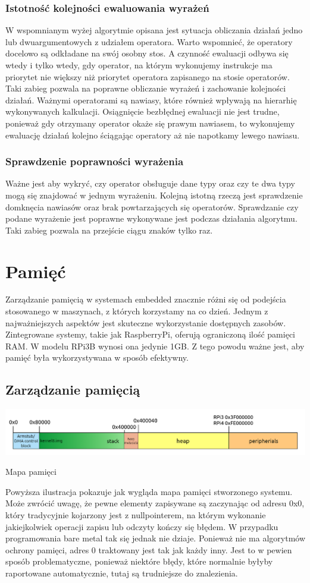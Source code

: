 \documentclass[shortabstract]{iithesis}
\begin{document}
\subsection{Istotność kolejności ewaluowania wyrażeń}
W wspomnianym wyżej algorytmie opisana jest sytuacja obliczania działań jedno lub dwuargumentowych z udziałem operatora. Warto wspomnieć, że operatory docelowo są odkładane na swój osobny stos. A czynność ewaluacji odbywa się wtedy i tylko wtedy, gdy operator, na którym wykonujemy instrukcje ma priorytet nie większy niż priorytet operatora zapisanego na stosie operatorów. Taki zabieg pozwala na poprawne obliczanie wyrażeń i zachowanie kolejności działań. Ważnymi operatorami są nawiasy, które również wpływają na hierarhię wykonywanych kalkulacji. Osiągnięcie bezbłędnej ewaluacji nie jest trudne, ponieważ gdy otrzymany operator okaże się prawym nawiasem, to wykonujemy ewaluację działań kolejno ściągając operatory aż nie napotkamy lewego nawiasu.
\subsection{Sprawdzenie poprawności wyrażenia}
Ważne jest aby wykryć, czy operator obsługuje dane typy oraz czy te dwa typy mogą się znajdować w jednym wyrażeniu. Kolejną istotną rzeczą jest sprawdzenie domknęcia nawiasów oraz brak powtarzających się operatorów. Sprawdzanie czy podane wyrażenie jest poprawne wykonywane jest podczas działania algorytmu. Taki zabieg pozwala na przejście ciągu znaków tylko raz.


\chapter{Pamięć}
Zarządzanie pamięcią w systemach embedded znacznie różni się od podejścia stosowanego w maszynach, z których korzystamy na co dzień. Jednym z najważniejszych aspektów jest skuteczne wykorzystanie dostępnych zasobów. Zintegrowane systemy, takie jak RaspberryPi, oferują ograniczoną ilość pamięci RAM. W modelu RPi3B wynosi ona jedynie 1GB. Z tego powodu ważne jest, aby pamięć była wykorzystywana w sposób efektywny.

\section{Zarządzanie pamięcią}
\begingroup
\centering
\includegraphics[width=\textwidth]{memorymap.png}
\captionsetup{type=figure}
\caption{Mapa pamięci}
\endgroup
Powyższa ilustracja pokazuje jak wygląda mapa pamięci stworzonego systemu. Może zwrócić uwagę, że pewne elementy zapisywane są zaczynając od adresu 0x0, który tradycyjnie kojarzony jest z nullpointerem, na którym wykonanie jakiejkolwiek operacji zapisu lub odczyty kończy się błędem. W przypadku programowania bare metal tak się jednak nie dziaje. Ponieważ nie ma algorytmów ochrony pamięci, adres 0 traktowany jest tak jak każdy inny. Jest to w pewien sposób problematyczne, ponieważ niektóre błędy, które normalnie byłyby raportowane automatycznie, tutaj są trudniejsze do znalezienia.
\end{document}
